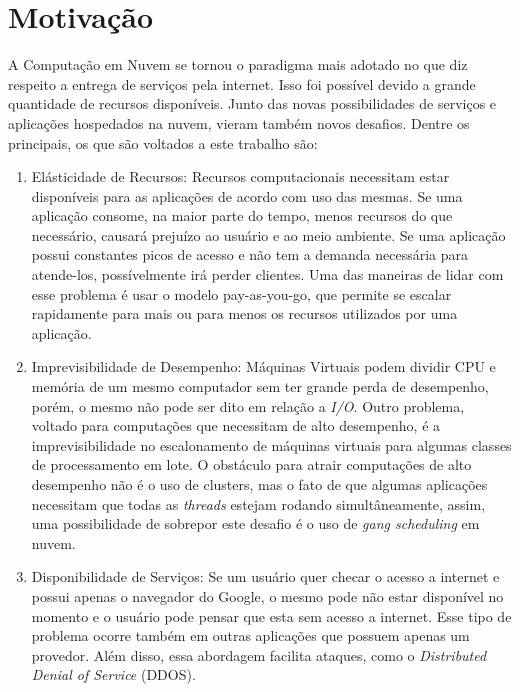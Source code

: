 \chapter{Motivação}
\label{sec:motivacao}

A Computação em Nuvem\cite{NIST:2011} se tornou o paradigma mais adotado no que diz respeito a entrega de serviços pela internet. Isso foi possível devido a grande quantidade de recursos disponíveis. Junto das novas possibilidades de serviços e aplicações hospedados na nuvem, vieram também novos desafios\cite{Armbrust09abovethe}. Dentre os principais, os que são voltados a este trabalho são:

\begin{enumerate}
    \item Elásticidade de Recursos: Recursos computacionais necessitam estar disponíveis para as aplicações de acordo com uso das mesmas. Se uma aplicação consome, na maior parte do tempo, menos recursos do que necessário, causará prejuízo ao usuário e ao meio ambiente. Se uma aplicação possui constantes picos de acesso e não tem a demanda necessária para atende-los, possívelmente irá perder clientes. 
    Uma das maneiras de lidar com esse problema é usar o modelo pay-as-you-go, que permite se escalar rapidamente para mais ou para menos os recursos utilizados por uma aplicação. 
    
    \item Imprevisibilidade de Desempenho: Máquinas Virtuais podem dividir CPU e memória de um mesmo computador sem ter grande perda de desempenho, porém, o mesmo não pode ser dito em relação a \textit{I/O}. Outro problema, voltado para computações que necessitam de alto desempenho, é a imprevisibilidade no escalonamento de máquinas virtuais para algumas classes de processamento em lote. O obstáculo para atrair computações de alto desempenho não é o uso de clusters, mas o fato de que algumas aplicações necessitam que todas as \textit{threads} estejam rodando simultâneamente, assim, uma possibilidade de sobrepor este desafio é o uso de \textit{gang scheduling} em nuvem.
    
    \item Disponibilidade de Serviços: Se um usuário quer checar o acesso a internet e possui apenas o navegador do Google, o mesmo pode não estar disponível no momento e o usuário pode pensar que esta sem acesso a internet. Esse tipo de problema ocorre também em outras aplicações que possuem apenas um provedor. Além disso, essa abordagem facilita ataques, como o \textit{Distributed Denial of Service} (DDOS).
    
    
    
\end{enumerate}


